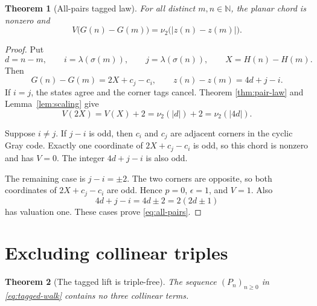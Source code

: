 \documentclass[11pt]{article}
\newtheorem{theorem}{Theorem}[section]
\theoremstyle{definition}
\theoremstyle{remark}
\newcommand{\N}{\mathbb N}
\newcommand{\vTwo}{\nu_2}
\newcommand{\abs}[1]{\lvert#1\rvert}
\begin{document}
\begin{theorem}[All-pairs tagged law]\label{thm:all-pairs}
For all distinct $m,n\in\N$, the planar chord is nonzero and
\begin{equation}\label{eq:all-pairs}
 V\bigl(G(n)-G(m)\bigr)=\vTwo\bigl(\abs{z(n)-z(m)}\bigr).
\end{equation}
\end{theorem}

\begin{proof}
Put
\[
 d=n-m,\qquad i=\lambda(\sigma(m)),\qquad
 j=\lambda(\sigma(n)),\qquad X=H(n)-H(m).
\]
Then
\begin{equation}\label{eq:tagged-chords}
 G(n)-G(m)=2X+c_j-c_i,\qquad z(n)-z(m)=4d+j-i.
\end{equation}
If $i=j$, the states agree and the corner tags cancel.  Theorem
\ref{thm:pair-law} and Lemma~\ref{lem:scaling} give
\[
 V(2X)=V(X)+2=\vTwo(\abs d)+2=\vTwo(\abs{4d}).
\]

Suppose $i\ne j$.  If $j-i$ is odd, then $c_i$ and $c_j$ are adjacent
corners in the cyclic Gray code.  Exactly one coordinate of
$2X+c_j-c_i$ is odd, so this chord is nonzero and has $V=0$.  The integer
$4d+j-i$ is also odd.

The remaining case is $j-i=\pm2$.  The two corners are opposite, so both
coordinates of $2X+c_j-c_i$ are odd.  Hence $p=0$, $\epsilon=1$, and
$V=1$.  Also
\[
 4d+j-i=4d\pm2=2(2d\pm1)
\]
has valuation one.  These cases prove \eqref{eq:all-pairs}.
\end{proof}

\section{Excluding collinear triples}\label{sec:triple}

\begin{theorem}[The tagged lift is triple-free]
\label{thm:tagged-triple-free}
The sequence $(P_n)_{n\geq0}$ in \eqref{eq:tagged-walk} contains no three
collinear terms.
\end{theorem}
\end{document}
